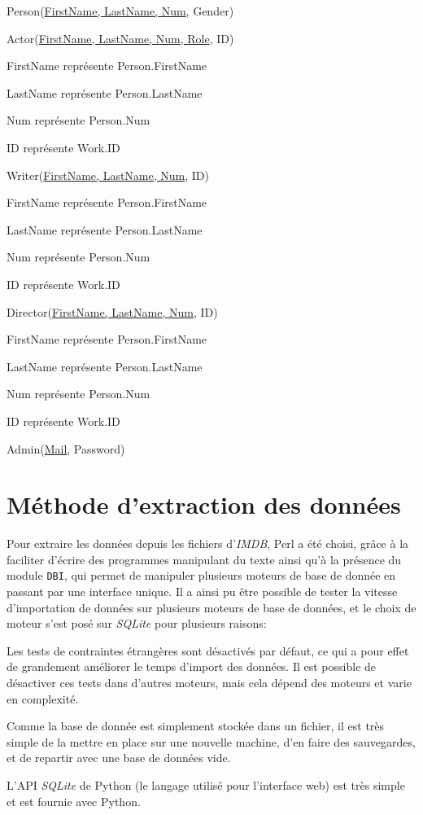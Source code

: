 \documentclass[a4paper,12pt]{article}
\begin{document}
Person(\underline{FirstName, LastName, Num}, Gender)

Actor(\underline{FirstName, LastName, Num, Role}, ID)
\begin{list}{-}{}
  \item FirstName représente Person.FirstName
  \item LastName représente Person.LastName
  \item Num représente Person.Num
  \item ID représente Work.ID
\end{list}

Writer(\underline{FirstName, LastName, Num}, ID)
\begin{list}{-}{}
  \item FirstName représente Person.FirstName
  \item LastName représente Person.LastName
  \item Num représente Person.Num
  \item ID représente Work.ID
\end{list}

Director(\underline{FirstName, LastName, Num}, ID)
\begin{list}{-}{}
  \item FirstName représente Person.FirstName
  \item LastName représente Person.LastName
  \item Num représente Person.Num
  \item ID représente Work.ID
\end{list}

Admin(\underline{Mail}, Password)
\section{Méthode d'extraction des données}
Pour extraire les données depuis les fichiers d'\emph{IMDB}, Perl a
été choisi, grâce à la faciliter d'écrire des programmes manipulant du
texte ainsi qu'à la présence du module \texttt{DBI}, qui permet de
manipuler plusieurs moteurs de base de donnée en passant par une
interface unique. Il a ainsi pu être possible de tester la vitesse
d'importation de données sur plusieurs moteurs de base de données, et
le choix de moteur s'est posé sur \emph{SQLite} pour plusieurs
raisons:

\begin{list}{-}{}
  \item Les tests de contraintes étrangères sont désactivés par
    défaut, ce qui a pour effet de grandement améliorer le temps
    d'import des données. Il est possible de désactiver ces tests dans
    d'autres moteurs, mais cela dépend des moteurs et varie en
    complexité.
  \item Comme la base de donnée est simplement stockée dans un
    fichier, il est très simple de la mettre en place sur une nouvelle
    machine, d'en faire des sauvegardes, et de repartir avec une base
    de données vide.
  \item L'API \emph{SQLite} de Python (le langage utilisé pour
    l'interface web) est très simple et est fournie avec Python.
\end{list}
\end{document}
